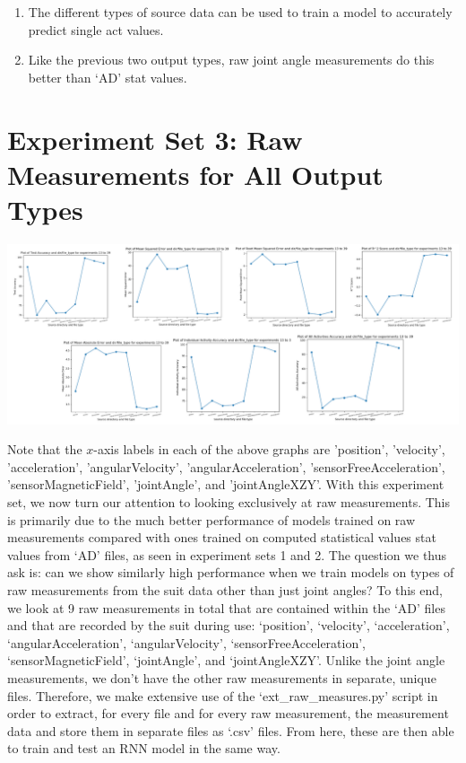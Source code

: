 \documentclass[12pt,twoside]{report}
\begin{document}
\begin{enumerate}
	\item The different types of source data can be used to train a model to accurately predict single act values.
	\item Like the previous two output types, raw joint angle measurements do this better than ‘AD’ stat values.
\end{enumerate}




\section{Experiment Set 3: Raw Measurements for All Output Types}

\begin{center}
\includegraphics[scale=0.4]{project_figures/fig10_9}
\end{center}

\quad Note that the $x$-axis labels in each of the above graphs are 'position', 'velocity', 'acceleration', 'angularVelocity', 'angularAcceleration', 'sensorFreeAcceleration', 'sensorMagneticField', 'jointAngle', and 'jointAngleXZY'. With this experiment set, we now turn our attention to looking exclusively at raw measurements. This is primarily due to the much better performance of models trained on raw measurements compared with ones trained on computed statistical values stat values from ‘AD’ files, as seen in experiment sets 1 and 2. The question we thus ask is: can we show similarly high performance when we train models on types of raw measurements from the suit data other than just joint angles? To this end, we look at 9 raw measurements in total that are contained within the ‘AD’ files and that are recorded by the suit during use: ‘position’, ‘velocity’, ‘acceleration’, ‘angularAcceleration’, ‘angularVelocity’, ‘sensorFreeAcceleration’, ‘sensorMagneticField’, ‘jointAngle’, and ‘jointAngleXZY’. Unlike the joint angle measurements, we don’t have the other raw measurements in separate, unique files. Therefore, we make extensive use of the ‘ext\_raw\_measures.py’ script in order to extract, for every file and for every raw measurement, the measurement data and store them in separate files as ‘.csv’ files. From here, these are then able to train and test an RNN model in the same way.\\
\end{document}
